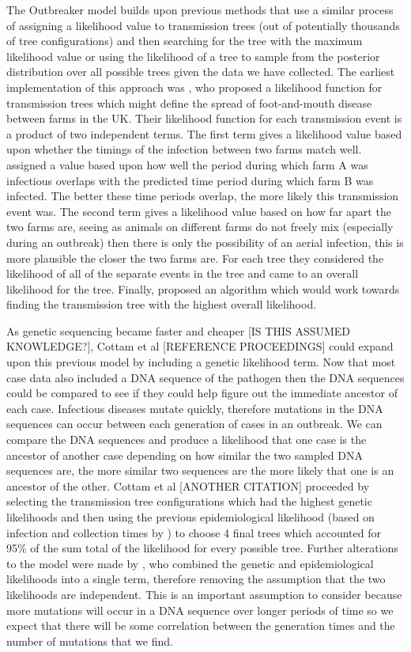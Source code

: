 \documentclass[11pt,a4paper]{report}
\begin{document}
The Outbreaker model builds upon previous methods that use a similar process of assigning a likelihood value to transmission trees (out of potentially thousands of tree configurations) and then searching for the tree with the maximum likelihood value or using the likelihood of a tree to sample from the posterior distribution over all possible trees given the data we have collected. The earliest implementation of this approach was \citet{Haydon03}, who proposed a likelihood function for transmission trees which might define the spread of foot-and-mouth disease between farms in the UK. Their likelihood function for each transmission event is a product of two independent terms. The first term gives a likelihood value based upon whether the timings of the infection between two farms match well. \citet{Haydon03} assigned a value based upon how well the period during which farm A was infectious overlaps with the predicted time period during which farm B was infected. The better these time periods overlap, the more likely this transmission event was. The second term gives a likelihood value based on how far apart the two farms are, seeing as animals on different farms do not freely mix (especially during an outbreak) then there is only the possibility of an aerial infection, this is more plausible the closer the two farms are. For each tree they considered the likelihood of all of the separate events in the tree and came to an overall likelihood for the tree. Finally, \citet{Haydon03} proposed an algorithm which would work towards finding the transmission tree with the highest overall likelihood.

As genetic sequencing became faster and cheaper [IS THIS ASSUMED KNOWLEDGE?], Cottam et al [REFERENCE PROCEEDINGS] could expand upon this previous model by including a genetic likelihood term. Now that most case data also included a DNA sequence of the pathogen then the DNA sequences could be compared to see if they could help figure out the immediate ancestor of each case. Infectious diseases mutate quickly, therefore mutations in the DNA sequences can occur between each generation of cases in an outbreak. We can compare the DNA sequences and produce a likelihood that one case is the ancestor of another case depending on how similar the two sampled DNA sequences are, the more similar two sequences are the more likely that one is an ancestor of the other. Cottam et al [ANOTHER CITATION] proceeded by selecting the transmission tree configurations which had the highest genetic likelihoods and then using the previous epidemiological likelihood (based on infection and collection times by \citet{Haydon03}) to choose 4 final trees which accounted for 95\% of the sum total of the likelihood for every possible tree. Further alterations to the model were made by \citet{Ypma13}, who combined the genetic and epidemiological likelihoods into a single term, therefore removing the assumption that the two likelihoods are independent. This is an important assumption to consider because more mutations will occur in a DNA sequence over longer periods of time so we expect that there will be some correlation between the generation times and the number of mutations that we find.
\end{document}
